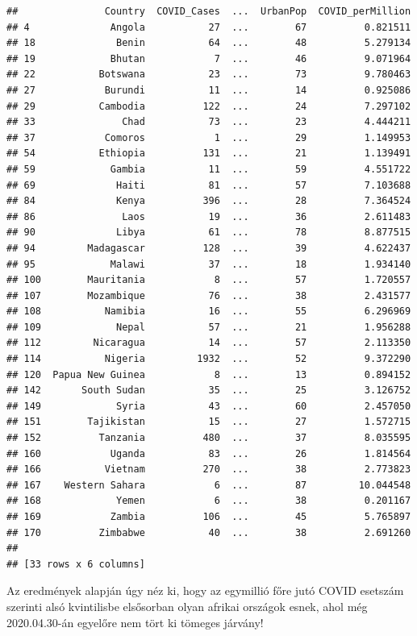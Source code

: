 \documentclass[
]{book}
\begin{document}
\begin{verbatim}
##               Country  COVID_Cases  ...  UrbanPop  COVID_perMillion
## 4              Angola           27  ...        67          0.821511
## 18              Benin           64  ...        48          5.279134
## 19             Bhutan            7  ...        46          9.071964
## 22           Botswana           23  ...        73          9.780463
## 27            Burundi           11  ...        14          0.925086
## 29           Cambodia          122  ...        24          7.297102
## 33               Chad           73  ...        23          4.444211
## 37            Comoros            1  ...        29          1.149953
## 54           Ethiopia          131  ...        21          1.139491
## 59             Gambia           11  ...        59          4.551722
## 69              Haiti           81  ...        57          7.103688
## 84              Kenya          396  ...        28          7.364524
## 86               Laos           19  ...        36          2.611483
## 90              Libya           61  ...        78          8.877515
## 94         Madagascar          128  ...        39          4.622437
## 95             Malawi           37  ...        18          1.934140
## 100        Mauritania            8  ...        57          1.720557
## 107        Mozambique           76  ...        38          2.431577
## 108           Namibia           16  ...        55          6.296969
## 109             Nepal           57  ...        21          1.956288
## 112         Nicaragua           14  ...        57          2.113350
## 114           Nigeria         1932  ...        52          9.372290
## 120  Papua New Guinea            8  ...        13          0.894152
## 142       South Sudan           35  ...        25          3.126752
## 149             Syria           43  ...        60          2.457050
## 151        Tajikistan           15  ...        27          1.572715
## 152          Tanzania          480  ...        37          8.035595
## 160            Uganda           83  ...        26          1.814564
## 166           Vietnam          270  ...        38          2.773823
## 167    Western Sahara            6  ...        87         10.044548
## 168             Yemen            6  ...        38          0.201167
## 169            Zambia          106  ...        45          5.765897
## 170          Zimbabwe           40  ...        38          2.691260
## 
## [33 rows x 6 columns]
\end{verbatim}

Az eredmények alapján úgy néz ki, hogy az egymillió főre jutó COVID esetszám szerinti alsó kvintilisbe elsősorban olyan afrikai országok esnek, ahol még 2020.04.30-án egyelőre nem tört ki tömeges járvány!
\end{document}
